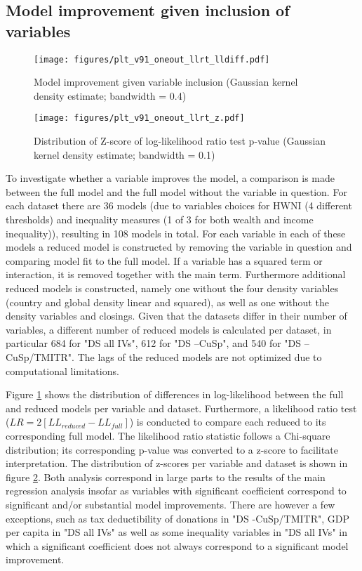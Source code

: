 \documentclass[11pt]{article}
\begin{document}
\subsection{Model improvement given inclusion of variables}
\label{app_llrt}
\begin{figure}[htbp]
\centering
\texttt{[image: figures/plt\_v91\_oneout\_llrt\_lldiff.pdf]}
\caption{\label{fig:oneout_llrt_lldiff}Model improvement given variable inclusion (Gaussian kernel density estimate; bandwidth = 0.4)}
\end{figure}


\begin{figure}[htbp]
\centering
\texttt{[image: figures/plt\_v91\_oneout\_llrt\_z.pdf]}
\caption{\label{fig:oneout_llrt_z}Distribution of Z-score of log-likelihood ratio test p-value (Gaussian kernel density estimate; bandwidth = 0.1)}
\end{figure}

To investigate whether a variable improves the model, a comparison is made between the full model and the full model without the variable in question.
For each dataset there are 36 models (due to variables choices for HWNI (4 different thresholds) and inequality measures (1 of 3 for both wealth and income inequality)), resulting in 108 models in total. 
For each variable in each of these models a reduced model is constructed by removing the variable in question and comparing model fit to the full model.
If a variable has a squared term or interaction, it is removed together with the main term.
Furthermore additional reduced models is constructed, namely one without the four density variables (country and global density linear and squared), as well as one without the density variables and closings.
Given that the datasets differ in their number of variables, a different number of reduced models is calculated per dataset, in particular 684 for "DS all IVs", 612 for "DS --CuSp", and 540 for "DS --CuSp/TMITR". 
The lags of the reduced models are not optimized due to computational limitations. 



Figure \ref{fig:oneout_llrt_lldiff} shows the distribution of differences in log-likelihood between the full and reduced models per variable and dataset.
Furthermore, a likelihood ratio test (\(LR = 2[LL_{reduced} - LL_{full}]\)) is conducted to compare each reduced to its corresponding full model.
The likelihood ratio statistic follows a Chi-square distribution; its corresponding p-value was converted to a z-score to facilitate interpretation.
The distribution of z-scores per variable and dataset is shown in figure \ref{fig:oneout_llrt_z}.
Both analysis correspond in large parts to the results of the main regression analysis insofar as variables with significant coefficient correspond to significant and/or substantial model improvements.
There are however a few exceptions, such as tax deductibility of donations in "DS -CuSp/TMITR", GDP per capita in "DS all IVs" as well as some inequality variables in "DS all IVs" in which a significant coefficient does not always correspond to a significant model improvement. 
\end{document}
